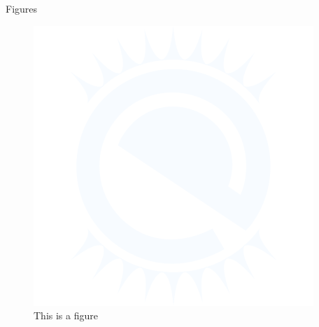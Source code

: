 \documentclass[aspectratio=169]{beamer}
\begin{document}
\begin{frame}{Figures}
   \begin{figure}[h!]\centering
      \includegraphics[scale=0.5]{img/e_logo}
      \caption{This is a figure}
   \end{figure}
\end{frame}
\end{document}
